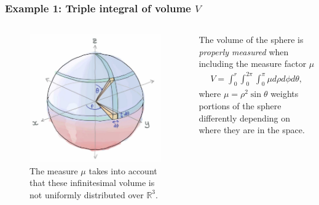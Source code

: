 \documentclass{beamer}
\begin{document}
\begin{frame}
  \frametitle{Example 1: Triple integral of volume $V$}
  \begin{columns}
    \begin{column}{0.4\textwidth}
  \begin{figure}
    \centering
    \includegraphics[scale=0.15]{sphere.png}
    \caption{The measure $\mu$ takes into account that these infinitesimal volume is not uniformly distributed over $\mathbb{R}^3$.}
  \end{figure}
\end{column}
\begin{column}{0.6\textwidth}
  The volume of the sphere is \textit{properly measured} when including the measure factor $\mu$
  \begin{align}
    V = \int_0^r\int_0^{2\pi}\int_0^\pi \mu d\rho d\phi d\theta,  
  \end{align}
  where $\mu = \rho^2\sin\theta$ weights portions of the sphere differently depending on where they are in the space.
\end{column}
\end{columns}
\end{frame}
\end{document}
